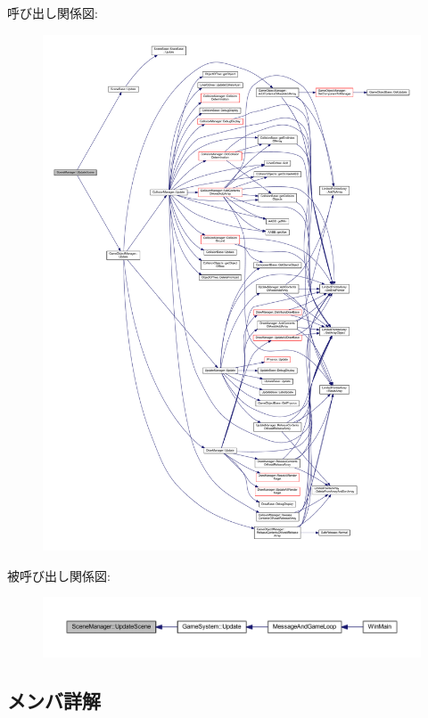 呼び出し関係図\+:
\nopagebreak
\begin{figure}[H]
\begin{center}
\leavevmode
\includegraphics[width=350pt]{class_scene_manager_a493bc0d65558ce004f6f248a185ba956_cgraph}
\end{center}
\end{figure}
被呼び出し関係図\+:
\nopagebreak
\begin{figure}[H]
\begin{center}
\leavevmode
\includegraphics[width=350pt]{class_scene_manager_a493bc0d65558ce004f6f248a185ba956_icgraph}
\end{center}
\end{figure}


\subsection{メンバ詳解}
\mbox{\label{class_scene_manager_a5f0f0da3d7f9a8a94f0b5a20c3a4908a}} 
